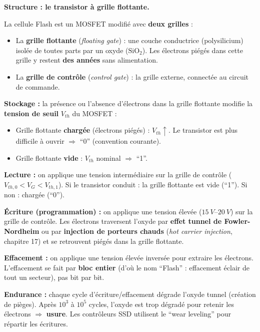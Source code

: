 \documentclass[12pt,a4paper,twoside]{book}
\begin{document}
\begin{formule}
\textbf{Structure : le transistor à grille flottante.}

La cellule Flash est un MOSFET modifié avec \textbf{deux grilles} :
\begin{itemize}[nosep]
\item La \textbf{grille flottante} (\textit{floating gate}) : une couche conductrice (polysilicium) isolée de toutes parts par un oxyde ($\text{SiO}_2$). Les électrons piégés dans cette grille y restent \textbf{des années} sans alimentation.
\item La \textbf{grille de contrôle} (\textit{control gate}) : la grille externe, connectée au circuit de commande.
\end{itemize}

\textbf{Stockage :} la présence ou l'absence d'électrons dans la grille flottante modifie la \textbf{tension de seuil} $V_{th}$ du MOSFET :
\begin{itemize}[nosep]
\item Grille flottante \textbf{chargée} (électrons piégés) : $V_{th} \uparrow$. Le transistor est plus difficile à ouvrir $\Rightarrow$ ``0'' (convention courante).
\item Grille flottante \textbf{vide} : $V_{th}$ nominal $\Rightarrow$ ``1''.
\end{itemize}

\textbf{Lecture :} on applique une tension intermédiaire sur la grille de contrôle ($V_{th,0} < V_G < V_{th,1}$). Si le transistor conduit : la grille flottante est vide (``1''). Si non : chargée (``0'').
\end{formule}

\begin{formule}
\textbf{Écriture (programmation) :} on applique une tension élevée ($\SI{15}{V}$--$\SI{20}{V}$) sur la grille de contrôle. Les électrons traversent l'oxyde par \textbf{effet tunnel de Fowler-Nordheim} ou par \textbf{injection de porteurs chauds} (\textit{hot carrier injection}, chapitre 17) et se retrouvent piégés dans la grille flottante.

\textbf{Effacement :} on applique une tension élevée inversée pour extraire les électrons. L'effacement se fait par \textbf{bloc entier} (d'où le nom ``Flash'' : effacement éclair de tout un secteur), pas bit par bit.

\textbf{Endurance :} chaque cycle d'écriture/effacement dégrade l'oxyde tunnel (création de pièges). Après $10^3$ à $10^5$ cycles, l'oxyde est trop dégradé pour retenir les électrons $\Rightarrow$ \textbf{usure}. Les contrôleurs SSD utilisent le ``wear leveling'' pour répartir les écritures.
\end{formule}
\end{document}
